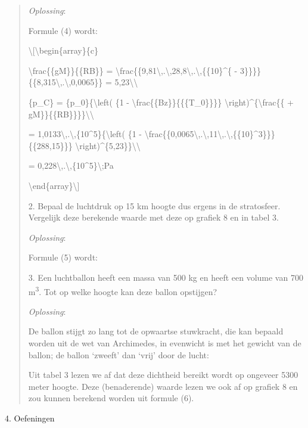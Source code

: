 \documentclass[]{article}
\begin{document}
\begin{quote}
\emph{Oplossing}:

Formule (4) wordt:

\textbackslash{}{[}\textbackslash{}begin\{array\}\{c\}

\textbackslash{}frac\{\{gM\}\}\{\{RB\}\} =
\textbackslash{}frac\{\{9,81\textbackslash{},.\textbackslash{},28,8\textbackslash{},.\textbackslash{},\{\{10\}\^{}\{
- 3\}\}\}\}\{\{8,315\textbackslash{},.\textbackslash{},0,0065\}\} =
5,23\textbackslash{}\textbackslash{}

\{p\_C\} = \{p\_0\}\{\textbackslash{}left( \{1 -
\textbackslash{}frac\{\{Bz\}\}\{\{\{T\_0\}\}\}\}
\textbackslash{}right)\^{}\{\textbackslash{}frac\{\{ +
gM\}\}\{\{RB\}\}\}\}\textbackslash{}\textbackslash{}

=
1,0133\textbackslash{},.\textbackslash{},\{10\^{}5\}\{\textbackslash{}left(
\{1 -
\textbackslash{}frac\{\{0,0065\textbackslash{},.\textbackslash{},11\textbackslash{},.\textbackslash{},\{\{10\}\^{}3\}\}\}\{\{288,15\}\}\}
\textbackslash{}right)\^{}\{5,23\}\}\textbackslash{}\textbackslash{}

= 0,228\textbackslash{},.\textbackslash{},\{10\^{}5\}\textbackslash{};Pa

\textbackslash{}end\{array\}\textbackslash{}{]}

2. Bepaal de luchtdruk op 15 km hoogte dus ergens in de stratosfeer.
Vergelijk deze berekende waarde met deze op grafiek 8 en in tabel 3.

\emph{Oplossing}:

Formule (5) wordt:

3. Een luchtballon heeft een massa van 500 kg en heeft een volume van
700 m\textsuperscript{3}. Tot op welke hoogte kan deze ballon opstijgen?

\emph{Oplossing}:

De ballon stijgt zo lang tot de opwaartse stuwkracht, die kan bepaald
worden uit de wet van Archimedes, in evenwicht is met het gewicht van de
ballon; de ballon `zweeft' dan `vrij' door de lucht:

Uit tabel 3 lezen we af dat deze dichtheid bereikt wordt op ongeveer
5300 meter hoogte. Deze (benaderende) waarde lezen we ook af op grafiek
8 en zou kunnen berekend worden uit formule (6).
\end{quote}

4. Oefeningen
\end{document}
